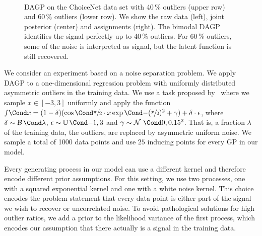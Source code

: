 \begin{figure}[t]
    \centering
    \hspace{-7pt}%
    \hspace{-7pt}%
    \\%
    \vspace{\figureskip}%
    \hspace{-7pt}%
    \hspace{-7pt}%
    \caption[Noise separation experiment]{
        \label{fig:data_association:choicenet}
        DAGP on the ChoiceNet data set with 40\,\% outliers (upper row) and 60\,\% outliers (lower row).
        We show the raw data (left), joint posterior (center) and assignments (right).
        The bimodal DAGP identifies the signal perfectly up to 40\,\% outliers.
        For 60\,\% outliers, some of the noise is interpreted as signal, but the latent function is still recovered.
    }
\end{figure}
%
We consider an experiment based on a noise separation problem.
We apply DAGP to a one-dimensional regression problem with uniformly distributed asymmetric outliers in the training data.
We use a task proposed by~\textcite{choi_choicenet_2018} where we sample $x \in [-3, 3]$ uniformly and apply the function $\Fun{f}{x} = (1 - \delta)(\Fun{\cos}{\sfrac{\pi}{2} \cdot x}\Fun{\exp}{-(\sfrac{x}{2})^2} + \gamma) + \delta \cdot \epsilon$, where $\delta \sim \Fun{\Ber}{\lambda}$, $\epsilon \sim \Fun{\Uni}{-1, 3}$ and $\gamma \sim \Gaussian{0, 0.15^2}$.
That is, a fraction $\lambda$ of the training data, the outliers, are replaced by asymmetric uniform noise.
We sample a total of 1000 data points and use $25$ inducing points for every GP in our model.

Every generating process in our model can use a different kernel and therefore encode different prior assumptions.
For this setting, we use two processes, one with a squared exponential kernel and one with a white noise kernel.
This choice encodes the problem statement that every data point is either part of the signal we wish to recover or uncorrelated noise.
To avoid pathological solutions for high outlier ratios, we add a prior to the likelihood variance of the first process, which encodes our assumption that there actually is a signal in the training data.

